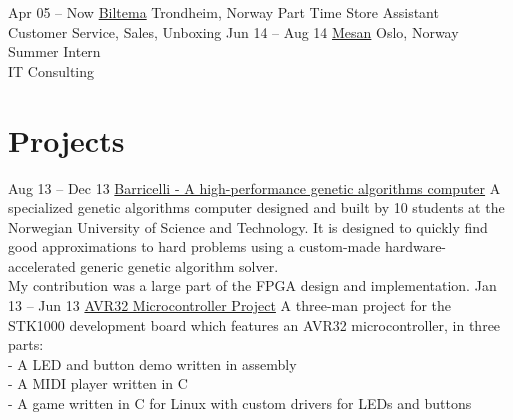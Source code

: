 \documentclass[print]{friggeri-cv}
\begin{document}
\begin{entrylist}
    \entry
        {Apr 05 – Now}
        {\href{http://biltema.no/}{Biltema}}
        {Trondheim, Norway}
        {Part Time Store Assistant\\
        Customer Service, Sales, Unboxing}
    \entry
        {Jun 14 – Aug 14}
        {\href{http://mesan.no/}{Mesan}}
        {Oslo, Norway}
        {Summer Intern\\
        IT Consulting}
\end{entrylist}

\section{Projects}

\begin{entrylist}
    \entry
        {Aug 13 – Dec 13}
        {\href{http://barricel.li/}{Barricelli - A high-performance genetic algorithms computer}}
        {}
        {A specialized genetic algorithms computer designed and built by 10 students at the Norwegian University of Science and Technology. It is designed to quickly find good approximations to hard problems using a custom-made hardware-accelerated generic genetic algorithm solver.\\
        My contribution was a large part of the FPGA design and implementation.}
    \entry
        {Jan 13 – Jun 13}
        {\href{https://github.com/lundal/avr32-project-2013}{AVR32 Microcontroller Project}}
        {}
        {A three-man project for the STK1000 development board which features an AVR32 microcontroller, in three parts:\\
        - A LED and button demo written in assembly\\
        - A MIDI player written in C\\
        - A game written in C for Linux with custom drivers for LEDs and buttons}
\end{entrylist}
\end{document}
